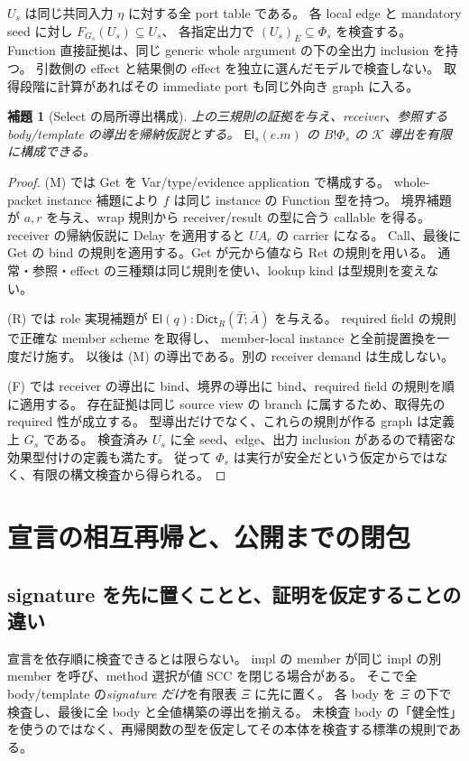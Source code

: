 \documentclass[11pt,a4paper]{article}
\newtheorem{lemma}[definition]{補題}
\newcommand{\Dict}{\mathsf{Dict}}
\newcommand{\El}{\mathsf{El}}
\newcommand{\Core}{\mathcal K}
\begin{document}
\(U_s\) は同じ共同入力 \(\eta\) に対する全 port table である。
各 local edge と mandatory seed に対し \(F_{G_s}(U_s)\subseteq U_s\)、
各指定出力で \((U_s)_E\subseteq\Phi_s\) を検査する。
Function 直接証拠は、同じ generic whole argument の下の全出力 inclusion を持つ。
引数側の effect と結果側の effect を独立に選んだモデルで検査しない。
取得段階に計算があればその immediate port も同じ外向き graph に入る。

\begin{lemma}[Select の局所導出構成]
上の三規則の証拠を与え、receiver、参照する body/template の導出を帰納仮説とする。
\(\El_s(e.m)\) の \(B!\Phi_s\) の \(\Core\) 導出を有限に構成できる。
\end{lemma}
\begin{proof}
(M) では Get を Var/type/evidence application で構成する。
whole-packet instance 補題により \(f\) は同じ instance の Function 型を持つ。
境界補題が \(a,r\) を与え、wrap 規則から receiver/result の型に合う callable を得る。
receiver の帰納仮説に Delay を適用すると \(UA_e\) の carrier になる。
Call、最後に Get の bind の規則を適用する。Get が元から値なら Ret の規則を用いる。
通常・参照・effect の三種類は同じ規則を使い、lookup kind は型規則を変えない。

(R) では role 実現補題が \(\El(q):\Dict_R(\bar T;\bar A)\) を与える。
required field の規則で正確な member scheme を取得し、
member-local instance と全前提置換を一度だけ施す。
以後は (M) の導出である。別の receiver demand は生成しない。

(F) では receiver の導出に bind、境界の導出に bind、required field の規則を順に適用する。
存在証拠は同じ source view の branch に属するため、取得先の required 性が成立する。
型導出だけでなく、これらの規則が作る graph は定義上 \(G_s\) である。
検査済み \(U_s\) に全 seed、edge、出力 inclusion があるので精密な効果型付けの定義も満たす。
従って \(\Phi_s\) は実行が安全だという仮定からではなく、有限の構文検査から得られる。
\end{proof}

\section{宣言の相互再帰と、公開までの閉包}
\label{sec:closing}

\subsection{signature を先に置くことと、証明を仮定することの違い}

宣言を依存順に検査できるとは限らない。
impl の member が同じ impl の別 member を呼び、method 選択が値 SCC を閉じる場合がある。
そこで全 body/template の\emph{signature だけ}を有限表 \(\Xi\) に先に置く。
各 body を \(\Xi\) の下で検査し、最後に全 body と全値構築の導出を揃える。
未検査 body の「健全性」を使うのではなく、再帰関数の型を仮定してその本体を検査する標準の規則である。
\end{document}
